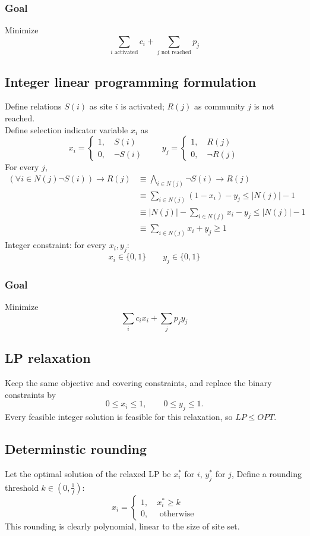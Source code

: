 \documentclass[10pt]{article}
\theoremstyle{definition}
\begin{document}
\subsubsection*{Goal}
Minimize 
\[\sum_{i \text{ activated}} c_i + \sum_{j \text{ not reached}} p_j\]
\subsection{Integer linear programming formulation}
Define relations $S(i)$ as site $i$ is activated; $R(j)$ as community $j$ is not reached.\\
Define selection indicator variable $x_i$ as 
\[x_i = \begin{cases}
  1, \quad S(i)\\
  0, \quad \neg S(i)
\end{cases}\quad\quad y_j = \begin{cases}
  1, \quad R(j) \\
  0, \quad \neg R(j)
\end{cases}\]
For every $j$, 
\begin{align*}
(\forall i \in N(j) \neg S(i)) \rightarrow R(j)
&\equiv \bigwedge_{i \in N(j)} \neg S(i) \rightarrow R(j)\\ 
&\equiv \sum_{i \in N(j)} (1 - x_i) - y_j \leq |N(j)| - 1\\
&\equiv |N(j)| - \sum_{i\in N(j)} x_i - y_j \leq |N(j)| - 1\\
&\equiv \sum_{i \in N(j)} x_i + y_j \geq 1
\end{align*}
Integer constraint: for every $x_i, y_j$:
\[  x_i \in \{0, 1\}\quad\quad
  y_j \in \{0, 1\}
\]
\subsubsection*{Goal}
Minimize 
\[\sum_{i} c_i x_i + \sum_{j} p_j y_j\]
\subsection{LP relaxation}
Keep the same objective and covering constraints, and replace
the binary constraints by
\[
0\leq x_i\leq 1,\qquad 0\leq y_j\leq 1.
\]
Every feasible integer solution is feasible for this relaxation,
so $LP\leq OPT$.
\subsection{Determinstic rounding} 
Let the optimal solution of the relaxed LP be $x^*_i$ for $i$, $y_j^*$ for $j$, 
Define a rounding threshold $k \in (0, \frac{1}{f})$:
\[x_i = \begin{cases}
  1, \quad x^*_i \geq k\\
  0, \quad \text{ otherwise}
\end{cases}\]
This rounding is clearly polynomial, linear to the size of site set. \\
\end{document}

